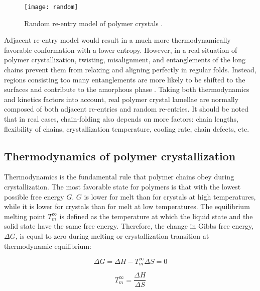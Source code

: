 \begin{figure}[H]
\center
\vspace{1 cm}
\texttt{[image: random]}
\caption[Random re-entry model of polymer crystals.]{Random re-entry model of polymer crystals \cite{High}.}
\label{fig:random}
\end{figure}

Adjacent re-entry model would result in a much more thermodynamically favorable conformation with a lower entropy. However, in a real situation of polymer crystallization, twisting, misalignment, and entanglements of the long chains prevent them from relaxing and aligning perfectly in regular folds. Instead, regions consisting too many entanglements are more likely to be shifted to the surfaces and contribute to the amorphous phase \cite{Strobl2007}. Taking both thermodynamics and kinetics factors into account, real polymer crystal lamellae are normally composed of both adjacent re-entries and random re-entries. It should be noted that in real cases, chain-folding also depends on more factors: chain lengths, flexibility of chains, crystallization temperature, cooling rate, chain defects, etc.
 
\subsection{Thermodynamics of polymer crystallization} \label{Thermodynamics of polymer crystallization}

Thermodynamics is the fundamental rule that polymer chains obey during crystallization. The most favorable state for polymers is that with the lowest possible free energy $G$. $G$ is lower for melt than for crystals at high temperatures, while it is lower for crystals than for melt at low temperatures. The equilibrium melting point $T_{m}^{\infty}$ is defined as the temperature at which the liquid state and the solid state have the same free energy. Therefore, the change in Gibbs free energy, $\Delta G$, is equal to zero during melting or crystallization transition at thermodynamic equilibrium:

\begin{equation}
\label{eqn_deltaG}
\Delta G = \Delta H - T_{m}^{\infty} \Delta S = 0
\end{equation}

\begin{equation}
\label{eqn_Tminfinity}
T_{m}^{\infty} = \dfrac{\Delta H}{\Delta S}
\end{equation}

